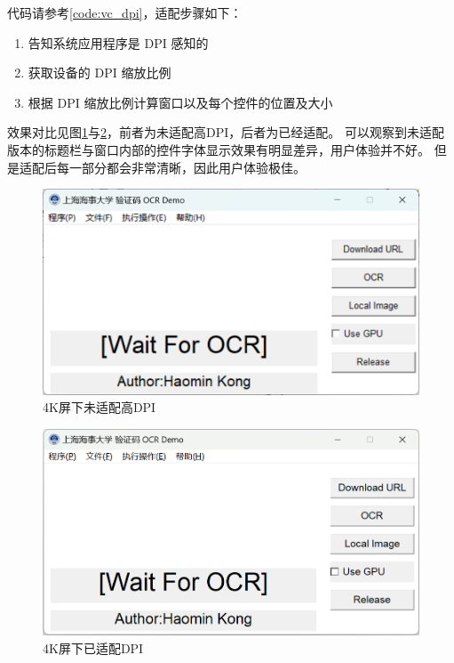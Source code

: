 代码请参考\ref{code:vc_dpi}，适配步骤如下：

\begin{enumerate}
	\item 告知系统应用程序是 DPI 感知的
	\item 获取设备的 DPI 缩放比例
	\item 根据 DPI 缩放比例计算窗口以及每个控件的位置及大小
\end{enumerate}

效果对比见图\ref{fig:dpilow}与\ref{fig:dpihigh}，前者为未适配高DPI，后者为已经适配。
可以观察到未适配版本的标题栏与窗口内部的控件字体显示效果有明显差异，用户体验并不好。
但是适配后每一部分都会非常清晰，因此用户体验极佳。

\begin{figure}
	\centering
	\includegraphics[width=0.9\linewidth]{Resources/Picture/Deploy/Windows/MSVC/dpi_low}
	\caption{4K屏下未适配高DPI}
	\label{fig:dpilow}
\end{figure}

\begin{figure}
	\centering
	\includegraphics[width=0.9\linewidth]{Resources/Picture/Deploy/Windows/MSVC/dpi_high}
	\caption{4K屏下已适配DPI}
	\label{fig:dpihigh}
\end{figure}

